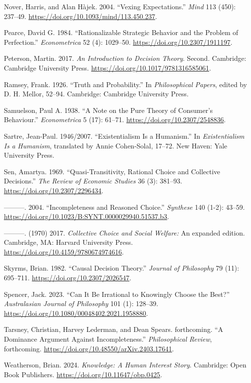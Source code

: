 \documentclass[
  10.5pt,
  twoside]{article}
\newlength{\cslhangindent}
\newenvironment{CSLReferences}[2] %
 {\begin{list}{}{%
  \setlength{\itemindent}{0pt}
  \setlength{\leftmargin}{0pt}
  \setlength{\parsep}{0pt}
  \ifodd #1
   \setlength{\leftmargin}{\cslhangindent}
   \setlength{\itemindent}{-1\cslhangindent}
  \fi
  \setlength{\itemsep}{#2\baselineskip}}}
 {\end{list}}
\begin{document}
\begin{CSLReferences}{1}{0}
Nover, Harris, and Alan Hàjek. 2004. {``Vexing Expectations.''}
\emph{Mind} 113 (450): 237--49.
\url{https://doi.org/10.1093/mind/113.450.237}.

Pearce, David G. 1984. {``Rationalizable Strategic Behavior and the
Problem of Perfection.''} \emph{Econometrica} 52 (4): 1029--50.
\url{https://doi.org/10.2307/1911197}.

Peterson, Martin. 2017. \emph{An Introduction to Decision Theory}.
Second. Cambridge: Cambridge University Press.
\url{https://doi.org/10.1017/9781316585061}.

Ramsey, Frank. 1926. {``Truth and Probability.''} In \emph{Philosophical
Papers}, edited by D. H. Mellor, 52--94. Cambridge: Cambridge University
Press.

Samuelson, Paul A. 1938. {``A Note on the Pure Theory of Consumer's
Behaviour.''} \emph{Econometrica} 5 (17): 61--71.
\url{https://doi.org/10.2307/2548836}.

Sartre, Jean-Paul. 1946/2007. {``Existentialism Is a Humanism.''} In
\emph{Existentialism Is a Humanism}, translated by Annie Cohen-Solal,
17--72. New Haven: Yale University Press.

Sen, Amartya. 1969. {``Quasi-Transitivity, Rational Choice and
Collective Decisions.''} \emph{The Review of Economic Studies} 36 (3):
381--93. \url{https://doi.org/10.2307/2296434}.

---------. 2004. {``Incompleteness and Reasoned Choice.''}
\emph{Synthese} 140 (1-2): 43--59.
\url{https://doi.org/10.1023/B:SYNT.0000029940.51537.b3}.

---------. (1970) 2017. \emph{Collective Choice and Social Welfare:} An
expanded edition. Cambridge, MA: Harvard University Press.
\url{https://doi.org/10.4159/9780674974616}.

Skyrms, Brian. 1982. {``Causal Decision Theory.''} \emph{Journal of
Philosophy} 79 (11): 695--711. \url{https://doi.org/10.2307/2026547}.

Spencer, Jack. 2023. {``Can It Be Irrational to Knowingly Choose the
Best?''} \emph{Australasian Journal of Philosophy} 101 (1): 128--39.
\url{https://doi.org/10.1080/00048402.2021.1958880}.

Tarsney, Christian, Harvey Lederman, and Dean Spears. forthcoming. {``A
Dominance Argument Against Incompleteness.''} \emph{Philosophical
Review}, forthcoming. \url{https://doi.org/10.48550/arXiv.2403.17641}.

Weatherson, Brian. 2024. \emph{Knowledge: A Human Interest Story}.
Cambridge: Open Book Publishers.
\url{https://doi.org/10.11647/obp.0425}.

\end{CSLReferences}
\end{document}
